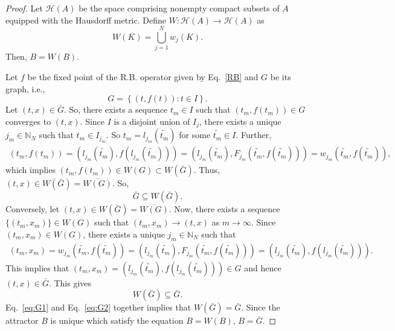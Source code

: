 \documentclass[sn-mathphys-num]{sn-jnl}
\numberwithin{equation}{section}
\begin{document}
\begin{proof}
Let $\mathcal{H}(A)$ be the space comprising nonempty compact subsets of $A$ equipped with the Hausdorff metric.
Define $W:\mathcal{H}(A)\rightarrow\mathcal{H}(A)$ as
\begin{equation*}
W(K)=\bigcup\limits_{j=1}^N w_j(K).
\end{equation*}
Then, $B=W(B)$. 

Let $f$ be the fixed point of the R.B. operator given by Eq.~\eqref{RB} and $G$ be its graph, i.e.,
\begin{equation*}
G=\left\{(t,f(t)):t\in I\right\}.
\end{equation*}
Let $(t,x)\in \bar{G}$. So, there exists a sequence $t_m\in I$ such that $(t_m,f(t_m))\in G$ converges to $(t,x)$. Since $I$ is a disjoint union of $I_j$, there exists a unique $j_m\in\mathbb N_N$ such that $t_m\in I_{j_m}$. So $t_m=l_{j_m}(\tilde{t_m})$ for some $\tilde{t_m}\in I$. Further,
\begin{eqnarray*}
(t_m,f(t_m))=(l_{j_m}(\tilde{t_m}),f(l_{j_m}(\tilde{t_m})))
=(l_{j_m}(\tilde{t_m}),F_{j_m}(\tilde{t_m},f(\tilde{t_m})))=w_{j_m}(\tilde{t_m},f(\tilde{t_m})),
\end{eqnarray*}
 which implies $(t_m,f(t_m))\in W(G)\subset W(\bar{G})$. Thus, $(t,x)\in W(\bar{G})=\overline{W(
G )}$. So, 
\begin{equation}
\bar{G}\subseteq W(\bar{G}).   \label{eq:G1}   
\end{equation}
Conversely, let $(t,x) \in W(\bar{G})=\overline{W(G)}$. Now, there exists a sequence $\{(t_m,x_m)\} \in W(G)$ such that $(t_m,x_m) \rightarrow (t,x)$ as $m \rightarrow \infty$. Since $(t_m,x_m) \in W(G)$, there exists a unique $j_m\in\mathbb N_N$ such that 
\begin{eqnarray*}
(t_m, x_m) = w_{j_m}(\tilde{t_m}, f(\tilde{t_m})) = (l_{j_m}(\tilde{t_m}),F_{j_m}(\tilde{t_m},f(\tilde{t_m}))) = (l_{j_m}(\tilde{t_m}),f(l_{j_m}(\tilde{t_m}))).  
\end{eqnarray*} 
This implies that $(t_m,x_m) = (l_{j_m}(\tilde{t_m}),f(l_{j_m}(\tilde{t_m}))) \in G$ and hence $(t,x) \in \bar{G}$. This gives
\begin{equation}
W(\bar{G})\subseteq \bar{G}. \label{eq:G2}   
\end{equation}
Eq.~\eqref{eq:G1} and Eq.~\eqref{eq:G2} together implies that $W(\bar{G})=\bar{G}$. Since the attractor $B$ is unique which satisfy the equation  $B=W(B)$, $B=\bar{G}$. 
\end{proof}	
\newpage
\end{document}
